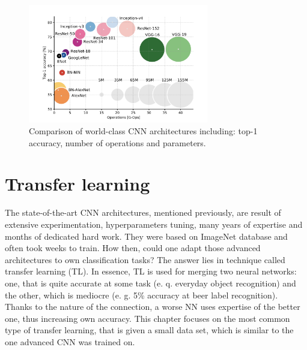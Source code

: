 \documentclass[11pt]{article}
\begin{document}
\begin{figure}[h]
\includegraphics[width=0.7\textwidth]{world_cnns}
\centering
\caption{Comparison of world-class CNN architectures \cite{canziani_analysis} including: top-1 accuracy, number of operations and parameters.}
\label{fig:world_cnns}
\end{figure}
\clearpage

\section{Transfer learning} \label{transfer_learning}
The state-of-the-art CNN architectures, mentioned previously, are result of extensive experimentation, hyperparameters tuning, many years of expertise and months of dedicated hard work. They were based on ImageNet database and often took weeks to train. How then, could one adapt those advanced architectures to own classification tasks? The answer lies in technique called transfer learning (TL). In essence, TL is used for merging two neural networks: one, that is quite accurate at some task (e. q. everyday object recognition) and the other, which is mediocre (e. g. 5\% accuracy at beer label recognition). Thanks to the nature of the connection, a worse NN uses expertise of the better one, thus increasing own accuracy. This chapter focuses on the most common type of transfer learning, that is given a small data set, which is similar to the one advanced CNN was trained on.\\
\end{document}
